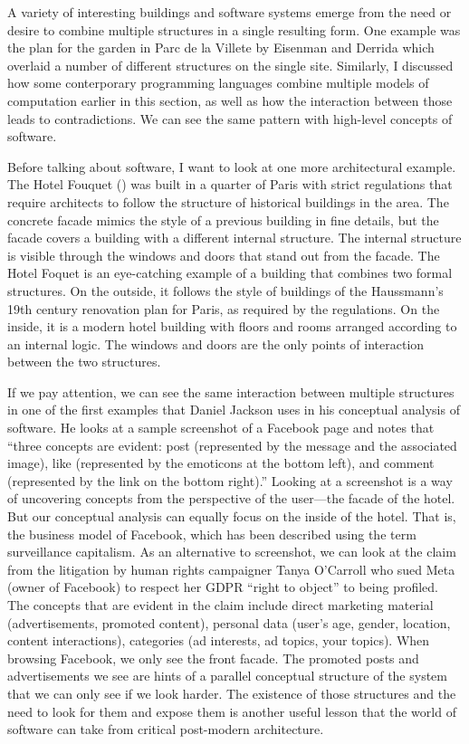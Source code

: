 A variety of interesting buildings and software systems emerge from the need or desire to combine
multiple structures in a single resulting form. One example was the plan for the garden in Parc
de la Villete by Eisenman and Derrida which overlaid a number of different structures on the single
site. Similarly, I discussed how some conterporary programming languages combine multiple models
of computation earlier in this section, as well as how the interaction between those leads to
contradictions. We can see the same pattern with high-level concepts of software.

Before talking about software, I want to look at one more architectural example.
The Hotel Fouquet () was built in a quarter of Paris with
strict regulations that require architects to follow the structure of historical
buildings in the area. The concrete facade mimics the style of a previous building in
fine details, but the facade covers a building with a different internal structure.
The internal structure is visible through the windows and doors that stand out from the facade.
The Hotel Foquet is an eye-catching example of a building that combines two formal structures.
On the outside, it follows the style of buildings of the Haussmann's 19th century renovation
plan for Paris, as required by the regulations. On the inside, it is a modern hotel building with
floors and rooms arranged according to an internal logic. The windows and doors are the only
points of interaction between the two structures.

If we pay attention, we can see the same interaction between multiple structures in
one of the first examples that Daniel Jackson uses in his conceptual analysis of software.
He looks at a sample screenshot of a Facebook page and notes that ``three concepts are evident:
post (represented by the message and the associated image), like (represented by the emoticons
at the bottom left), and comment (represented by the link on the bottom right).''
Looking at a screenshot is a way of uncovering concepts from the perspective of the user---the
facade of the hotel. But our conceptual analysis can equally focus on the inside of the
hotel. That is, the business model of Facebook, which has been described using the term
surveillance capitalism. As an alternative to screenshot, we can look at the claim
from the litigation by human rights campaigner Tanya O'Carroll who sued Meta (owner of Facebook)
to respect her GDPR ``right to object'' to being profiled.
The concepts that are evident in the claim include direct marketing material (advertisements,
promoted content), personal data (user's age, gender, location, content interactions),
categories (ad interests, ad topics, your topics). When browsing Facebook, we only see the front
facade. The promoted posts and advertisements we see are hints of a parallel conceptual
structure of the system that we can only see if we look harder. The existence of those structures
and the need to look for them and expose them is another useful lesson that the world of software
can take from critical post-modern architecture.


